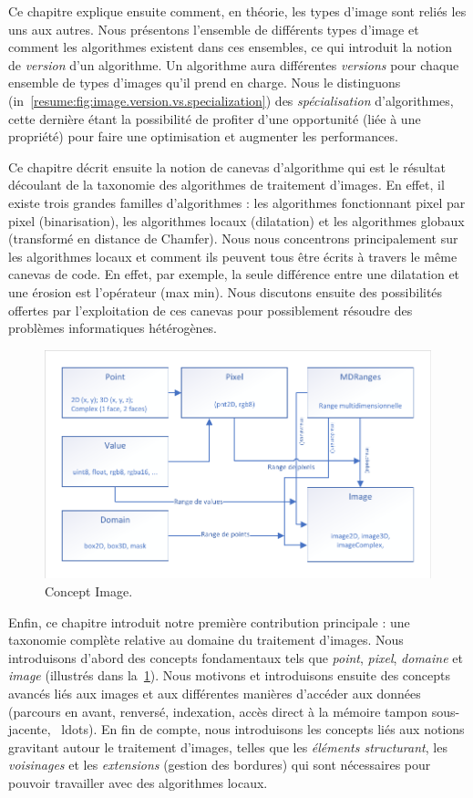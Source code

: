 Ce chapitre explique ensuite comment, en théorie, les types d'image sont reliés les uns aux autres. Nous présentons
l'ensemble de différents types d'image et comment les algorithmes existent dans ces ensembles, ce qui introduit la
notion de \emph{version} d'un algorithme. Un algorithme aura différentes \emph{versions} pour chaque ensemble de types
d'images qu'il prend en charge. Nous le distinguons (in~\cref{resume:fig:image.version.vs.specialization}) des
\emph{spécialisation} d'algorithmes, cette dernière étant la possibilité de profiter d'une opportunité (liée à une
propriété) pour faire une optimisation et augmenter les performances.

Ce chapitre décrit ensuite la notion de canevas d'algorithme qui est le résultat découlant de la taxonomie des
algorithmes de traitement d'images. En effet, il existe trois grandes familles d'algorithmes : les algorithmes
fonctionnant pixel par pixel (binarisation), les algorithmes locaux (dilatation) et les algorithmes globaux (transformé
en distance de Chamfer). Nous nous concentrons principalement sur les algorithmes locaux et comment ils peuvent tous
être écrits à travers le même canevas de code. En effet, par exemple, la seule différence entre une dilatation et une
érosion est l'opérateur (max \vs min). Nous discutons ensuite des possibilités offertes par l'exploitation de ces
canevas pour possiblement résoudre des problèmes informatiques hétérogènes.

\begin{figure}[htbp]
  \centering
  \includegraphics[width=.8\linewidth]{../figures/concepts/image_fr}
  \caption[]{Concept Image.}
  \label{resume:fig:concept.image}
\end{figure}

Enfin, ce chapitre introduit notre première contribution principale : une taxonomie complète relative au domaine du
traitement d'images. Nous introduisons d'abord des concepts fondamentaux tels que \emph{point}, \emph{pixel},
\emph{domaine} et \emph{image} (illustrés dans la~\cref{resume:fig:concept.image}). Nous motivons et introduisons
ensuite des concepts avancés liés aux images et aux différentes manières d'accéder aux données (parcours en avant,
renversé, indexation, accès direct à la mémoire tampon sous-jacente, \ ldots). En fin de compte, nous introduisons les
concepts liés aux notions gravitant autour le traitement d'images, telles que les \emph{éléments structurant}, les
\emph{voisinages} et les \emph{extensions} (gestion des bordures) qui sont nécessaires pour pouvoir travailler avec des
algorithmes locaux.

